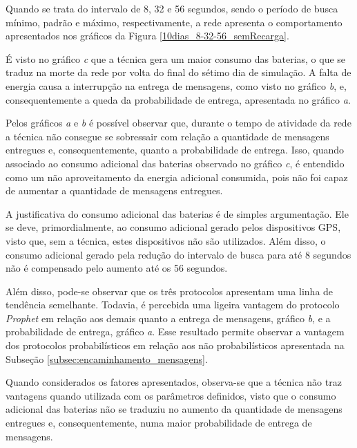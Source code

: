 Quando se trata do intervalo de 8, 32 e 56 segundos, sendo o período de busca mínimo, padrão e máximo, respectivamente, a rede apresenta o comportamento apresentados nos gráficos da Figura \ref{10dias_8-32-56_semRecarga}.

É visto no gráfico \emph{c} que a técnica gera um maior consumo das baterias, o que se traduz na morte da rede por volta do final do sétimo dia de simulação. A falta de energia causa a interrupção na entrega de mensagens, como visto no gráfico \emph{b}, e, consequentemente a queda da probabilidade de entrega, apresentada no gráfico \emph{a}.

Pelos gráficos \emph{a} e \emph{b} é possível observar que, durante o tempo de atividade da rede a técnica não consegue se sobressair com relação a quantidade de mensagens entregues e, consequentemente, quanto a probabilidade de entrega. Isso, quando associado ao consumo adicional das baterias observado no gráfico \emph{c}, é entendido como um não aproveitamento da energia adicional consumida, pois não foi capaz de aumentar a quantidade de mensagens entregues.

A justificativa do consumo adicional das baterias é de simples argumentação. Ele se deve, primordialmente, ao consumo adicional gerado pelos dispositivos GPS, visto que, sem a técnica, estes dispositivos não são utilizados. Além disso, o consumo adicional gerado pela redução do intervalo de busca para até 8 segundos não é compensado pelo aumento até os 56 segundos.

Além disso, pode-se observar que os três protocolos apresentam uma linha de tendência semelhante. Todavia, é percebida uma ligeira vantagem do protocolo \emph{Prophet} em relação aos demais quanto a entrega de mensagens, gráfico \emph{b}, e a probabilidade de entrega, gráfico \emph{a}. Esse resultado permite observar a vantagem dos protocolos probabilísticos em relação aos não probabilísticos apresentada na Subseção \ref{subsec:encaminhamento_mensagens}.

Quando considerados os fatores apresentados, observa-se que a técnica não traz vantagens quando utilizada com os parâmetros definidos, visto que o consumo adicional das baterias não se traduziu no aumento da quantidade de mensagens entregues e, consequentemente, numa maior probabilidade de entrega de mensagens.

